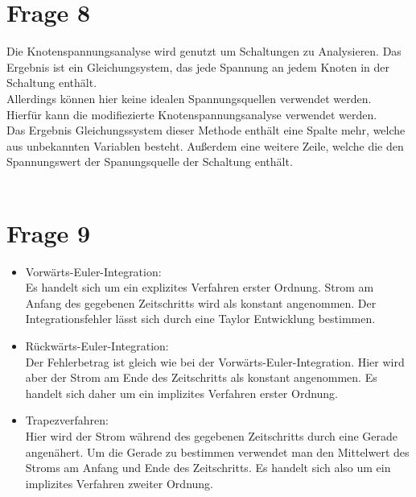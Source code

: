 \documentclass[a4paper]{scrartcl}
\begin{document}
\section*{Frage 8}
Die Knotenspannungsanalyse wird genutzt um Schaltungen zu Analysieren. Das Ergebnis ist ein Gleichungsystem, das jede Spannung an jedem Knoten in der Schaltung enthält.\\
Allerdings können hier keine idealen Spannungsquellen verwendet werden.\\
Hierfür kann die modifiezierte Knotenspannungsanalyse verwendet werden.\\
Das Ergebnis Gleichungssystem dieser Methode enthält eine Spalte mehr, welche aus unbekannten Variablen besteht. Außerdem eine weitere Zeile, welche die den Spannungswert der Spanungsquelle der Schaltung enthält.
~\\
~\\



\section*{Frage 9}
\begin{itemize}
	\item Vorwärts-Euler-Integration: \\
	Es handelt sich um ein explizites Verfahren erster Ordnung. Strom am Anfang des gegebenen Zeitschritts wird als konstant angenommen. Der Integrationsfehler lässt sich durch eine Taylor Entwicklung bestimmen.
	 
	\item Rückwärts-Euler-Integration: \\
	Der Fehlerbetrag ist gleich wie bei der Vorwärts-Euler-Integration. Hier wird aber der Strom am Ende des Zeitschritts als konstant angenommen. Es handelt sich daher um ein implizites Verfahren erster Ordnung.
	
	\item Trapezverfahren:\\
	Hier wird der Strom während des gegebenen Zeitschritts durch eine Gerade angenähert. Um die Gerade zu bestimmen verwendet man den Mittelwert des Stroms am Anfang und Ende des Zeitschritts. Es handelt sich also um ein implizites Verfahren zweiter Ordnung.
		
\end{itemize}
~\\
~\\
\end{document}
